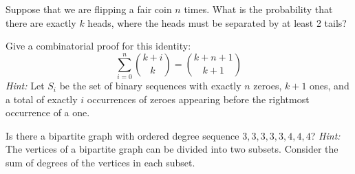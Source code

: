 \documentclass[12pt,twoside]{article}
\begin{document}
\newpage
\begin{problem}{20}
\bparts
{} Suppose that we are flipping a fair coin $n$ times. What is 
the probability that there are exactly $k$ heads, where the heads
must be separated by at least 2 tails?


 Give a combinatorial proof for this identity:
\[
\sum_{i=0}^n \binom{k+i}{k} = \binom{k+n+1}{k+1}
\]
\textit{Hint: }Let $S_i$ be the set of binary sequences with exactly $n$
zeroes, $k + 1$ ones, and a total of exactly $i$ occurrences of zeroes
appearing before the rightmost occurrence of a one.
\eparts
\end{problem}

\newpage

\begin{problem}{10}
Is there a bipartite graph with ordered degree sequence $3, 3, 3, 3, 3, 4, 4, 4$?
\textit{Hint: } The vertices of a bipartite graph can be divided into two subsets.  Consider the sum of degrees of the vertices in each subset.
\end{problem}




\newpage
\end{document}
